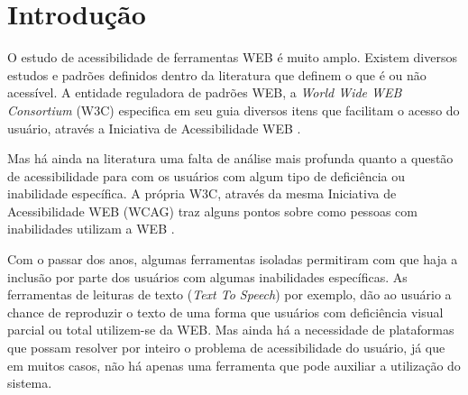 \documentclass[
	12pt,				%
	oneside,			%
	a4paper,			%
	english,			%
	brazil				%
	]{abntex2ppgsi}
\begin{document}
\tableofcontents*
\cleardoublepage

\textual



% 
%
%
\chapter{Introdução}
\label{sec:intro}


O estudo de acessibilidade de ferramentas WEB é muito amplo. Existem diversos estudos e padrões definidos dentro da literatura que definem o que é ou não acessível. A entidade reguladora de padrões WEB, a \textit{World Wide WEB Consortium} (W3C) especifica em seu guia diversos itens que facilitam o acesso do usuário, através a Iniciativa de Acessibilidade WEB . 

Mas há ainda na literatura uma falta de análise mais profunda quanto a questão de acessibilidade para com os usuários com algum tipo de deficiência ou inabilidade específica. A própria W3C, através da mesma Iniciativa de Acessibilidade WEB (WCAG) traz alguns pontos sobre como pessoas com inabilidades utilizam a WEB .

Com o passar dos anos, algumas ferramentas isoladas permitiram com que haja a inclusão por parte dos usuários com algumas inabilidades específicas. As ferramentas de leituras de texto (\textit{Text To Speech}) por exemplo, dão ao usuário a chance de reproduzir o texto de uma forma que usuários com deficiência visual parcial ou total utilizem-se da WEB. Mas ainda há a necessidade de plataformas que possam resolver por inteiro o problema de acessibilidade do usuário, já que em muitos casos, não há apenas uma ferramenta que pode auxiliar a utilização do sistema. 

\end{document}

